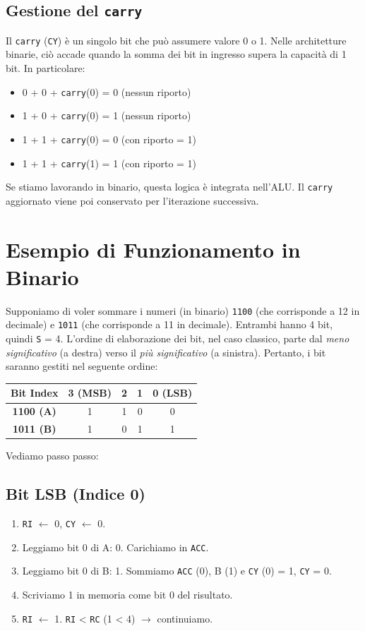 \documentclass[a4paper,12pt]{report}
\begin{document}
\subsection{Gestione del \texttt{carry}}
Il \texttt{carry} (\texttt{CY}) è un singolo bit che può assumere valore 0 o 1. Nelle architetture binarie, ciò accade quando la somma dei bit in ingresso supera la capacità di 1 bit. In particolare:
\begin{itemize}
    \item 0 + 0 + \texttt{carry}(0) = 0 (nessun riporto)
    \item 1 + 0 + \texttt{carry}(0) = 1 (nessun riporto)
    \item 1 + 1 + \texttt{carry}(0) = 0 (con riporto = 1)
    \item 1 + 1 + \texttt{carry}(1) = 1 (con riporto = 1)
\end{itemize}
Se stiamo lavorando in binario, questa logica è integrata nell'ALU. Il \texttt{carry} aggiornato viene poi conservato per l'iterazione successiva.

\section{Esempio di Funzionamento in Binario}
Supponiamo di voler sommare i numeri (in binario) \texttt{1100} (che corrisponde a 12 in decimale) e \texttt{1011} (che corrisponde a 11 in decimale). Entrambi hanno 4 bit, quindi \texttt{S} = 4. L'ordine di elaborazione dei bit, nel caso classico, parte dal \textit{meno significativo} (a destra) verso il \textit{più significativo} (a sinistra). Pertanto, i bit saranno gestiti nel seguente ordine:

\begin{center}
\begin{tabular}{c|c|c|c|c}
\textbf{Bit Index} & \textbf{3 (MSB)} & \textbf{2} & \textbf{1} & \textbf{0 (LSB)} \\
\hline
\textbf{1100 (A)} & 1 & 1 & 0 & 0 \\
\textbf{1011 (B)} & 1 & 0 & 1 & 1 \\
\end{tabular}
\end{center}

Vediamo passo passo:

\subsection*{Bit LSB (Indice 0)}
\begin{enumerate}
    \item \texttt{RI} $\leftarrow$ 0, \texttt{CY} $\leftarrow$ 0.
    \item Leggiamo bit 0 di A: 0. Carichiamo in \texttt{ACC}.
    \item Leggiamo bit 0 di B: 1. Sommiamo \texttt{ACC} (0), B (1) e \texttt{CY} (0) = 1, \texttt{CY} = 0.
    \item Scriviamo 1 in memoria come bit 0 del risultato.
    \item \texttt{RI} $\leftarrow$ 1. \texttt{RI} < \texttt{RC} (1 < 4) $\rightarrow$ continuiamo.
\end{enumerate}
\end{document}
